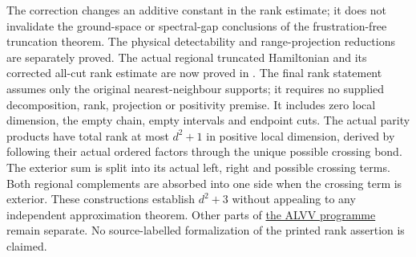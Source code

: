 \documentclass{article}
\begin{document}
The correction changes an additive constant in the rank estimate; it
does not invalidate the ground-space or spectral-gap conclusions of the
frustration-free truncation theorem. The physical detectability and
range-projection reductions are separately proved. The actual regional
truncated Hamiltonian and its corrected all-cut
rank estimate are now proved in
. The final
rank statement assumes only the original nearest-neighbour supports; it
requires no supplied decomposition, rank, projection or positivity premise.
It includes zero local dimension, the empty chain, empty intervals and
endpoint cuts. The actual parity products have total rank at most $d^2+1$
in positive local dimension, derived by following their actual ordered
factors through the unique possible crossing bond. The exterior sum is
split into its actual left, right and possible crossing terms. Both
regional complements are absorbed into one side when the crossing term
is exterior. These constructions establish $d^2+3$ without appealing to
any independent approximation theorem. Other parts of
\href{https://github.com/LionSR/TNLean/issues/9833}{the ALVV programme}
remain separate.
No source-labelled formalization of the printed rank assertion is claimed.



\end{document}

